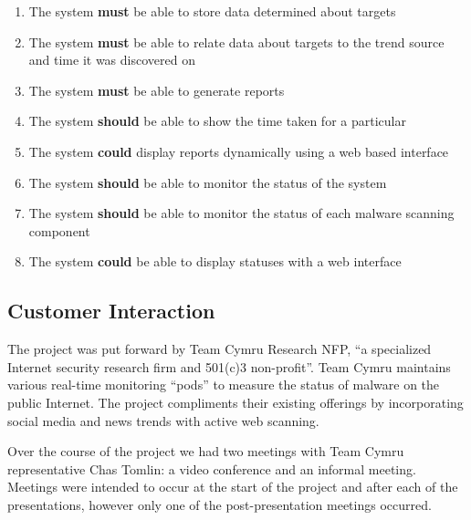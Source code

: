 \begin{enumerate}
    \item The system \textbf{must} be able to store data determined about targets
    \item The system \textbf{must} be able to relate data about targets to the trend source and time it was discovered on
    \item The system \textbf{must} be able to generate reports
    \item The system \textbf{should} be able to show the time taken for a particular 
    \item The system \textbf{could} display reports dynamically using a web based interface
    \item The system \textbf{should} be able to monitor the status of the system
    \item The system \textbf{should} be able to monitor the status of each malware scanning component
    \item The system \textbf{could} be able to display statuses with a web interface
\end{enumerate}

\subsection{Customer Interaction}
The project was put forward by Team Cymru Research NFP, ``a specialized Internet security research firm and 501(c)3 non-profit''\cite{team-cymru}. Team Cymru maintains various real-time monitoring ``pods'' to measure the status of malware on the public Internet. The project compliments their existing offerings by incorporating social media and news trends with active web scanning.

Over the course of the project we had two meetings with Team Cymru representative Chas Tomlin: a video conference and an informal meeting.  Meetings were intended to occur at the start of the project and after each of the presentations, however only one of the post-presentation meetings occurred.

